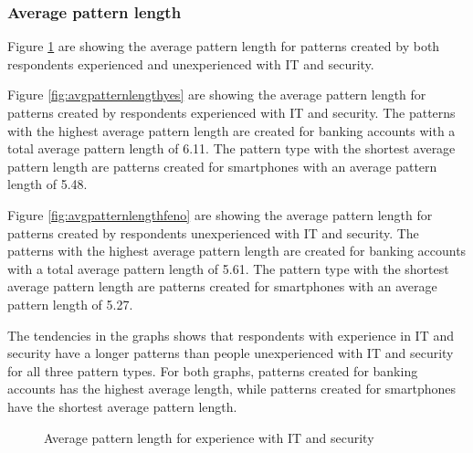     \subsubsection{Average pattern length}

      Figure \ref{fig:avgpatternlengthexperience} are showing the average pattern length for patterns created by both respondents experienced and unexperienced with IT and security.

      Figure \ref{fig:avgpatternlengthyes} are showing the average pattern length for patterns created by respondents experienced with IT and security. The patterns with the highest average pattern length are created for banking accounts with a total average pattern length of 6.11. The pattern type with the shortest average pattern length are patterns created for smartphones with an average pattern length of 5.48.

      Figure \ref{fig:avgpatternlengthfeno} are showing the average pattern length for patterns created by respondents unexperienced with IT and security. The patterns with the highest average pattern length are created for banking accounts with a total average pattern length of 5.61. The pattern type with the shortest average pattern length are patterns created for smartphones with an average pattern length of 5.27. 

      The tendencies in the graphs shows that respondents with experience in IT and security have a longer patterns than people unexperienced with IT and security for all three pattern types. For both graphs, patterns created for banking accounts has the highest average length, while patterns created for smartphones have the shortest average pattern length. 

      \begin{figure}[H]
        \centering
        \caption{Average pattern length for experience with IT and security}
        \label{fig:avgpatternlengthexperience}
      \end{figure}

